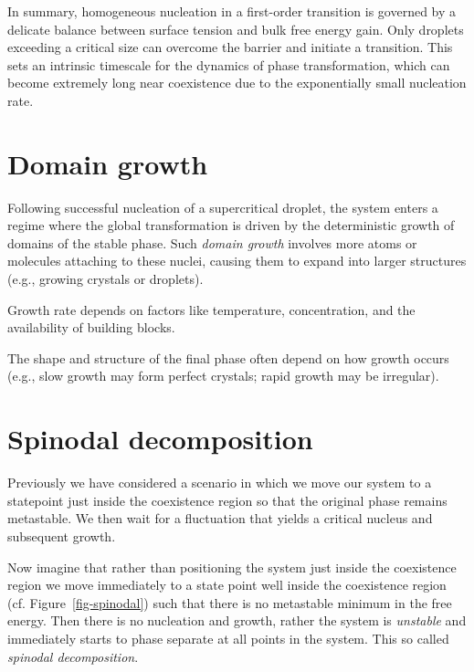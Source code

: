 \documentclass[
  letterpaper,
  enabledeprecatedfontcommands]{report}
\begin{document}
In summary, homogeneous nucleation in a first-order transition is
governed by a delicate balance between surface tension and bulk free
energy gain. Only droplets exceeding a critical size can overcome the
barrier and initiate a transition. This sets an intrinsic timescale for
the dynamics of phase transformation, which can become extremely long
near coexistence due to the exponentially small nucleation rate.

\section{Domain growth}\label{domain-growth}

Following successful nucleation of a supercritical droplet, the system
enters a regime where the global transformation is driven by the
deterministic growth of domains of the stable phase. Such \emph{domain
growth} involves more atoms or molecules attaching to these nuclei,
causing them to expand into larger structures (e.g., growing crystals or
droplets).

Growth rate depends on factors like temperature, concentration, and the
availability of building blocks.

The shape and structure of the final phase often depend on how growth
occurs (e.g., slow growth may form perfect crystals; rapid growth may be
irregular).

\section{Spinodal decomposition}\label{spinodal-decomposition}

Previously we have considered a scenario in which we move our system to
a statepoint just inside the coexistence region so that the original
phase remains metastable. We then wait for a fluctuation that yields a
critical nucleus and subsequent growth.

Now imagine that rather than positioning the system just inside the
coexistence region we move immediately to a state point well inside the
coexistence region (cf. Figure~\ref{fig-spinodal}) such that there is no
metastable minimum in the free energy. Then there is no nucleation and
growth, rather the system is \emph{unstable} and immediately starts to
phase separate at all points in the system. This so called
\emph{spinodal decomposition}.
\end{document}
